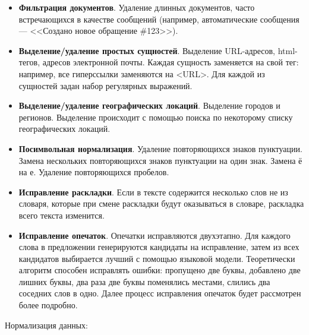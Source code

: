 \begin{itemize}
    \item  \textbf{Фильтрация документов}. Удаление длинных документов, часто встречающихся в качестве сообщений (например, автоматические сообщения — <<Создано новое обращение \#123>>).
    \item \textbf{Выделение/удаление простых сущностей}. Выделение URL-адресов, html-тегов, адресов электронной почты. Каждая сущность заменяется на свой тег: например, все гиперссылки заменяются на <URL>. Для каждой из сущностей задан набор регулярных выражений.
\item \textbf{Выделение/удаление географических локаций}. Выделение городов и регионов. Выделение происходит с помощью поиска по некоторому списку географических локаций.
\item \textbf{Посимвольная нормализация}. Удаление повторяющихся знаков пунктуации. Замена нескольких повторяющихся знаков пунктуации на один знак. Замена ё на е. Удаление повторяющихся пробелов.
\item \textbf{Исправление раскладки}. Если в тексте содержится несколько слов не из словаря, которые при смене раскладки будут оказываться в словаре, раскладка всего текста изменится.
\item \textbf{Исправление опечаток}. Опечатки исправляются двухэтапно. Для каждого слова в предложении генерируются кандидаты на исправление, затем из всех кандидатов выбирается лучший с помощью языковой модели. Теоретически алгоритм способен исправлять ошибки: пропущено две буквы, добавлено две лишних буквы, два раза две буквы поменялись местами, слились два соседних слов в одно. Далее процесс исправления опечаток будет рассмотрен более подробно.
\end{itemize}

Нормализация данных:

